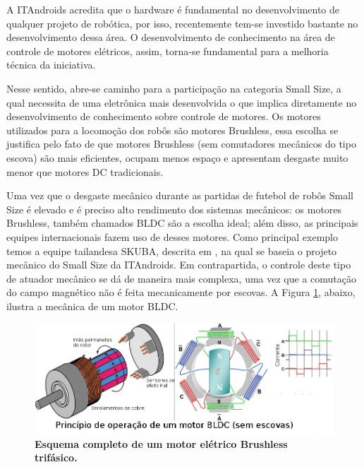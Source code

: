 \documentclass[10pt,fleqn,a4paper]{article}
\begin{document}
    A ITAndroids acredita que o hardware é fundamental no desenvolvimento de qualquer projeto de robótica, por isso, recentemente tem-se investido bastante no desenvolvimento dessa área. O desenvolvimento de conhecimento na área de controle de motores elétricos, assim, torna-se fundamental para a melhoria técnica da iniciativa.
    
    Nesse sentido, abre-se caminho para a participação na categoria Small Size, a qual necessita de uma eletrônica mais desenvolvida o que implica diretamente no desenvolvimento de conhecimento sobre controle de motores. Os motores utilizados para a locomoção dos robôs são motores Brushless, essa escolha se justifica pelo fato de que motores Brushless (sem comutadores mecânicos do tipo escova) são mais eficientes, ocupam menos espaço e apresentam desgaste muito menor que motores DC tradicionais.
    
    Uma vez que o desgaste mecânico durante as partidas de futebol de robôs Small Size é elevado e é preciso alto rendimento dos sistemas mecânicos: os motores Brushless, também chamados BLDC são a escolha ideal; além disso, as principais equipes internacionais fazem uso de desses motores. Como principal exemplo temos a equipe tailandesa SKUBA, descrita em \cite{skuba}, na qual se baseia o projeto mecânico do Small Size da ITAndroids. Em contrapartida, o controle deste tipo de atuador mecânico se dá de maneira mais complexa, uma vez que a comutação do campo magnético não é feita mecanicamente por escovas. A Figura \ref{fig:esquemamotor}, abaixo, ilustra a mecânica de um motor BLDC.

	\begin{figure}[ht]
		\begin{center}
			\includegraphics[angle=0, scale=0.2]{images/4-Pole-brushless-DC-motor-animation}
		\end{center}
		\caption{\textbf{Esquema completo de um motor elétrico Brushless trifásico.}}
		\label{fig:esquemamotor}
	\end{figure}
    
\end{document}

